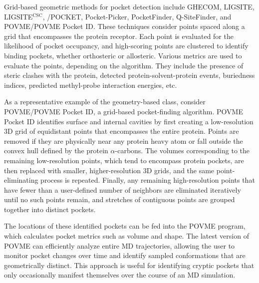 \par Grid-based geometric methods for pocket detection include GHECOM,\cite{Kawabata2010a} LIGSITE,\cite{Hendlich1997a} LIGSITE$^{\textrm{CSC}}$,\cite{Huang2006a} /POCKET,\cite{Levitt1992a} Pocket-Picker,\cite{Weisel2007a} PocketFinder,\cite{An2005a} Q-SiteFinder,\cite{Laurie2005a} and POVME\-/POVME Pocket ID.\cite{Durrant2014a,Durrant2011} These techniques consider points spaced along a grid that encompasses the protein receptor. Each point is evaluated for the likelihood of pocket occupancy, and high-scoring points are clustered to identify binding pockets, whether orthosteric or allosteric. Various metrics are used to evaluate the points, depending on the algorithm. They include the presence of steric clashes with the protein, detected protein-solvent-protein events,\cite{Levitt1992a,Hendlich1997a} buriedness indices,\cite{Weisel2007a} predicted methyl-probe interaction energies,\cite{Laurie2005a,An2005a} etc.
\par As a representative example of the geometry-based class, consider POVME/POVME Pocket ID, a grid-based pocket-finding algorithm.\cite{Durrant2014a,Durrant2011} POVME Pocket ID identifies surface and internal cavities by first creating a low-resolution 3D grid of equidistant points that encompasses the entire protein. Points are removed if they are physically near any protein heavy atom or fall outside the convex hull defined by the protein $\alpha$-carbons. The volumes corresponding to the remaining low-resolution points, which tend to encompass protein pockets, are then replaced with smaller, higher-resolution 3D grids, and the same point-eliminating process is repeated. Finally, any remaining high-resolution points that have fewer than a user-defined number of neighbors are eliminated iteratively until no such points remain, and stretches of contiguous points are grouped together into distinct pockets.
\par The locations of these identified pockets can be fed into the POVME program, which calculates pocket metrics such as volume and shape. The latest version of POVME can efficiently analyze entire MD trajectories, allowing the user to monitor pocket changes over time and identify sampled conformations that are geometrically distinct. This approach is useful for identifying cryptic pockets that only occasionally manifest themselves over the course of an MD simulation.
